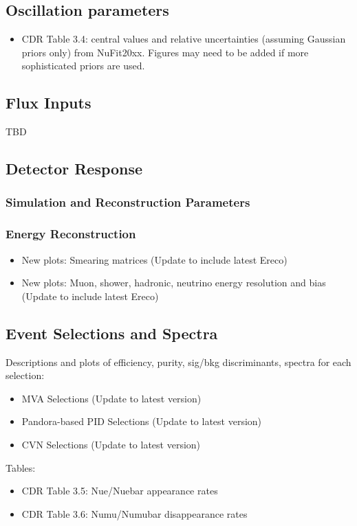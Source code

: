 \subsection{Oscillation parameters}
\begin{itemize}
\item CDR Table 3.4: central values and relative uncertainties (assuming Gaussian priors only) from NuFit20xx. Figures may need to be added if more sophisticated priors are used.

\end{itemize}

\subsection{Flux Inputs}
TBD

\subsection{Detector Response}
\subsubsection{Simulation and Reconstruction Parameters}
\subsubsection{Energy Reconstruction}
\begin{itemize}
\item New plots: Smearing matrices (Update to include latest Ereco)
\item New plots: Muon, shower, hadronic, neutrino energy resolution and bias  (Update to include latest Ereco)
\end{itemize}

\subsection{Event Selections and Spectra}
Descriptions and plots of efficiency, purity, sig/bkg discriminants, spectra for each selection:
\begin{itemize}
\item MVA Selections (Update to latest version)
\item Pandora-based PID Selections (Update to latest version)
\item CVN Selections (Update to latest version)
\end{itemize}

Tables:
\begin{itemize}
	\item CDR Table 3.5: Nue/Nuebar appearance rates
	\item CDR Table 3.6: Numu/Numubar disappearance rates
\end{itemize}

